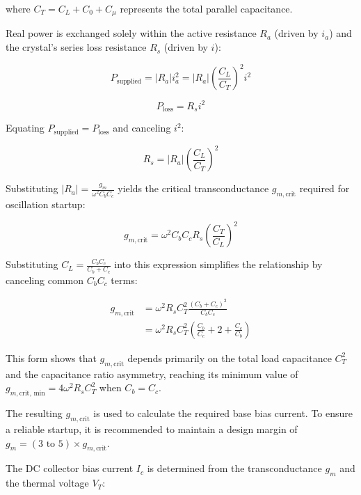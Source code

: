 where $C_T = C_L + C_0 + C_\mu$ represents the total parallel capacitance.

Real power is exchanged solely within the active resistance $R_a$ (driven by $i_a$) and the crystal's series loss resistance $R_s$ (driven by $i$):

\begin{equation}
	P_{\text{supplied}} = |R_a| i_a^2 = |R_a| \left(\frac{C_L}{C_T}\right)^2 i^2
\end{equation}

\begin{equation}
	P_{\text{loss}} = R_s i^2
\end{equation}

Equating $P_{\text{supplied}} = P_{\text{loss}}$ and canceling $i^2$:

\begin{equation}
	R_s = |R_a| \left(\frac{C_L}{C_T}\right)^2
\end{equation}

Substituting $|R_a| = \frac{g_m}{\omega^2 C_b C_c}$ yields the critical transconductance $g_{m,\text{crit}}$ required for oscillation startup:

\begin{equation}
	g_{m,\text{crit}} = \omega^2 C_b C_c R_s \left(\frac{C_T}{C_L}\right)^2
\end{equation}

Substituting $C_L = \frac{C_b C_c}{C_b + C_c}$ into this expression simplifies the relationship by canceling common $C_b C_c$ terms:

\begin{align}
	g_{m,\text{crit}} &= \omega^2 R_s C_T^2 \frac{(C_b + C_c)^2}{C_b C_c} \nonumber \\
	&= \omega^2 R_s C_T^2 \left( \frac{C_b}{C_c} + 2 + \frac{C_c}{C_b} \right)
\end{align}

This form shows that $g_{m,\text{crit}}$ depends primarily on the total load capacitance $C_T^2$ and the capacitance ratio asymmetry, reaching its minimum value of $g_{m,\text{crit, min}} = 4 \omega^2 R_s C_T^2$ when $C_b = C_c$.


The resulting $g_{m,\text{crit}}$ is used to calculate the required base bias current. To ensure a reliable startup, it is recommended to maintain a design margin of $g_m = (3 \text{ to } 5) \times g_{m,\text{crit}}$.

The DC collector bias current $I_c$ is determined from the transconductance $g_m$ and the thermal voltage $V_T$:

